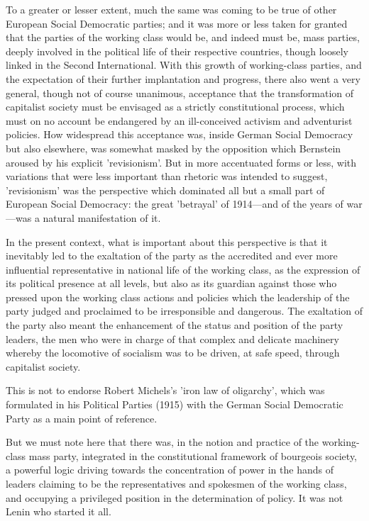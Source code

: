 To a greater or lesser extent, much the same was coming to be true of other European Social Democratic parties; and it was more or less taken for granted that the parties of the working class would be, and indeed must be, mass parties, deeply involved in the political life of their respective countries, though loosely linked in the Second International. With this growth of working-class parties, and the expectation of their further implantation and progress, there also went a very general, though not of course unanimous, acceptance that the transformation of capitalist society must be envisaged as a strictly constitutional process, which must on no account be endangered by an ill-conceived activism and adventurist policies. How widespread this acceptance was, inside German Social Democracy but also elsewhere, was somewhat masked by the opposition which Bernstein aroused by his explicit 'revisionism'. But in more accentuated forms or less, with variations that were less important than rhetoric was intended to suggest, 'revisionism' was the perspective which dominated all but a small part of European Social Democracy: the great 'betrayal' of 1914—and of the years of war—was a natural manifestation of it.

In the present context, what is important about this perspective is that it inevitably led to the exaltation of the party as the accredited and ever more influential representative in national life of the working class, as the expression of its political presence at all levels, but also as its guardian against those who pressed upon the working class actions and policies which the leadership of the party judged and proclaimed to be irresponsible and dangerous. The exaltation of the party also meant the enhancement of the status and position of the party leaders, the men who were in charge of that complex and delicate machinery whereby the locomotive of socialism was to be driven, at safe speed, through capitalist society.

This is not to endorse Robert Michels's 'iron law of oligarchy', which was formulated in his Political Parties (1915) with the German Social Democratic Party as a main point of reference.

But we must note here that there was, in the notion and practice of the working-class mass party, integrated in the constitutional framework of bourgeois society, a powerful logic driving towards the concentration of power in the hands of leaders claiming to be the representatives and spokesmen of the working class, and occupying a privileged position in the determination of policy. It was not Lenin who started it all.

